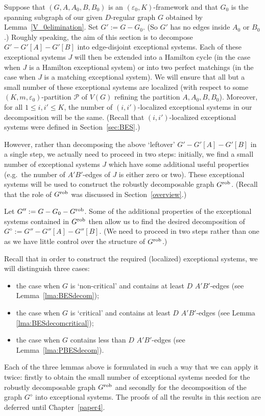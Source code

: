 \documentclass{memo-l}
\def\COMMENT#1{}
\def\eps{\varepsilon}
\def\epszero{\eps_0}
\numberwithin{section}{chapter}
\numberwithin{equation}{section}
\numberwithin{firstthm}{section}
\numberwithin{figure}{section}
\begin{document}
Suppose that $(G,A,A_0,B,B_0)$ is an $(\epszero,K)$-framework and that $G_0$ is the spanning subgraph of our given $D$-regular graph $G$ obtained by Lemma~\ref{V_0elimination}.
Set $G' := G - G_0$. (So $G'$ has no edges inside $A_0$ or $B_0$.) 
Roughly speaking, the aim of this section is to decompose $G'- G'[A] - G'[B]$ into edge-disjoint exceptional systems.
Each of these exceptional systems $J$ will then be extended into a Hamilton cycle (in the case when $J$ is a Hamilton exceptional system) or into
two perfect matchings (in the case when $J$ is a matching exceptional system). We will ensure that all but a small number of these
exceptional systems are localized (with respect to some $(K,m, \epszero)$-partition $\mathcal{P}$ of $V(G)$ refining
the partition $A,A_0,B,B_0$). Moreover, for all $1\le i, i' \le K$, the number of $ (i,i')$-localized exceptional systems in our decomposition
will be the same. (Recall that $ (i,i')$-localized exceptional systems were defined in Section~\ref{sec:BES}.) 

However, rather than decomposing the above `leftover' $G'- G'[A] - G'[B]$ in a single step, we actually need to proceed in two steps:
initially, we find a small number of exceptional systems $J$ which have some additional useful properties (e.g.~the number of $A'B'$-edges of $J$
is either zero or two). These exceptional systems will be used to construct the robustly decomposable graph $G^{\rm rob}$.
(Recall that the role of $G^{\rm rob}$ was discussed in Section~\ref{overview}.)%
    \COMMENT{Daniela: new sentence}
Let $G'':=G-G_0-G^{\rm rob}$. Some of the additional properties of the exceptional systems contained in $G^{\rm rob}$ then allow us to 
find the desired decomposition of  $G^{\diamond} := G''- G''[A] - G''[B]$.
(We need to proceed in two steps rather than one as we have little control over the structure of $G^{\rm rob}$.)

Recall that
in order to construct the required (localized) exceptional systems, we will distinguish three cases:
\begin{itemize}
\item[(a)] the case when $G$ is `non-critical' and contains at least $D$ $A'B'$-edges (see Lemma~\ref{lma:BESdecom}); 
\item[(b)] the case when $G$ is `critical' and contains
at least $D$ $A'B'$-edges (see Lemma \ref{lma:BESdecomcritical});
\item[(c)] the case when $G$ contains less than $D$ $A'B'$-edges (see Lemma~\ref{lma:PBESdecom}).  
\end{itemize}
Each of the three lemmas above is formulated in such a way that we can apply it twice:
firstly to obtain the small number of exceptional systems needed for the robustly decomposable graph $G^{\rm rob}$ and secondly for the 
decomposition of the graph $G^{\diamond}$ into exceptional systems. The proofs of all the results in this section are deferred until Chapter~\ref{paper4}.
\end{document}
